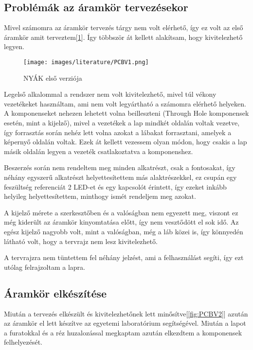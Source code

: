 \subsection{Problémák az áramkör tervezésekor}

Mivel számomra az áramkör tervezés tárgy nem volt elérhető, így ez volt az első 
áramkör amit terveztem[\ref{fig:PCBV1}]. Így többször át kellett alakítsam, hogy kivitelezhető legyen.

\begin{figure}[h]
    \centering
    \texttt{[image: images/literature/PCBV1.png]}
    \caption{NYÁK első verziója}
    \label{fig:PCBV1}
\end{figure}

Legelső alkalommal a rendszer nem volt kivitelezhető, mivel túl vékony vezetékeket
használtam, ami nem volt legyártható a számomra elérhető helyeken. A komponenseket 
nehezen lehetett volna beilleszteni (Through Hole komponensek esetén, mint a kijelző),
mivel a vezetékek a lap mindkét oldalán voltak vezetve, így forrasztás során nehéz
lett volna azokat a lábakat forrasztani, amelyek a képernyő oldalán voltak.
Ezek át kellett vezessem olyan módon, hogy csakis a lap másik oldalán legyen a vezeték
csatlakoztatva a komponenshez.

Beszerzés során nem rendeltem meg minden alkatrészt, csak a fontosakat, így néhány
egyszerű alkatrészt helyettesítettem más alaktrészekkel, ez csupán egy feszültség referenciát
2 LED-et és egy kapcsolót érintett, így ezeket inkább helyileg helyettesítettem, minthogy
ismét rendeljem meg azokat.

A kijelző mérete a szerkesztőben és a valóságban nem egyezett meg, viszont ez még 
kiderült az áramkör kinyomtatása előtt, így nem vesztődött el sok idő. Az egész
kijelző nagyobb volt, mint a valóságban, még a láb közei is, így könnyedén látható
volt, hogy a tervrajz nem lesz kivitelezhető.

A tervrajzra nem tüntettem fel néhány jelzést, ami a felhasználást segíti, így ezt 
utólag felrajzoltam a lapra.

\subsection{Áramkör elkészítése}

Miután a tervezés elkészült és kivitelezhetőnek lett minősítve[\ref{fig:PCBV2}] azután az áramkör
el lett készítve az egyetemi laboratórium segítségével. Miután a lapot a furatokkal és a réz
huzalozással megkaptam azután elkezdtem a komponensek felhelyezését.

